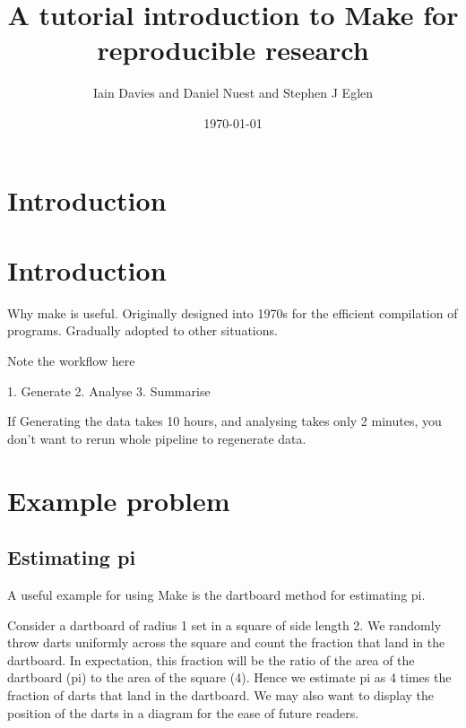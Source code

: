 \documentclass[12pt]{article}\usepackage[]{graphicx}\usepackage[]{color}
\begin{document}
\title{A tutorial introduction to Make for reproducible research}
\author{Iain Davies and Daniel Nuest and Stephen J Eglen}

\date{\today}
\maketitle


\section{Introduction}





\section{Introduction}

Why make is useful.  Originally designed into 1970s for the efficient
compilation of programs.  Gradually adopted to other situations.


Note the workflow here

1. Generate
2. Analyse
3. Summarise


If Generating the data takes 10 hours, and analysing takes only 2
minutes, you don't want to rerun whole pipeline to regenerate data.


\section{Example problem}


\subsection{Estimating pi}

A useful example for using Make is the dartboard method for estimating pi.

Consider a dartboard of radius 1 set in a square of side length 2. We randomly throw darts uniformly across the square and count the fraction that land in the dartboard. In expectation, this fraction will be the ratio of the area of the dartboard (pi) to the area of the square (4). Hence we estimate pi as 4 times the fraction of darts that land in the dartboard. We may also want to display the position of the darts in a diagram for the ease of future readers.
\end{document}
